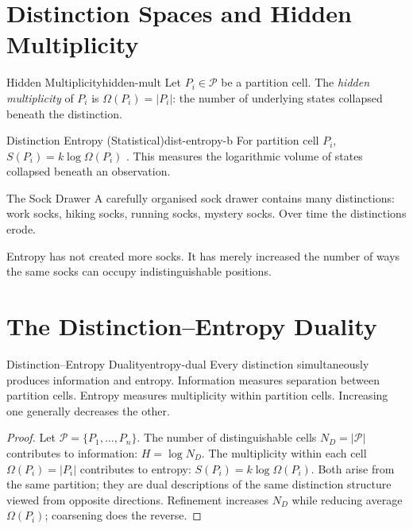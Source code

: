 \documentclass[12pt,twoside,openright]{book}
\newcommand{\partition}{\mathcal{P}}
\begin{document}
\section{Distinction Spaces and Hidden Multiplicity}
\label{sec:ch3-hidden}

\begin{definition}{Hidden Multiplicity}{hidden-mult}
  Let $P_i \in \partition$ be a partition cell.
  The \emph{hidden multiplicity} of $P_i$ is
  $\Omega(P_i) = |P_i|$: the number of underlying
  states collapsed beneath the distinction.
\end{definition}

\begin{definition}{Distinction Entropy (Statistical)}{dist-entropy-b}
  For partition cell $P_i$,
  $S(P_i) = k \log \Omega(P_i)$
  \parencite{boltzmann1877}.
  This measures the logarithmic volume of states
  collapsed beneath an observation.
\end{definition}

\begin{distinctionaside}{The Sock Drawer}
A carefully organised sock drawer contains many
distinctions: work socks, hiking socks, running socks,
mystery socks. Over time the distinctions erode.

Entropy has not created more socks. It has merely increased
the number of ways the same socks can occupy
indistinguishable positions.
\end{distinctionaside}

\section{The Distinction--Entropy Duality}
\label{sec:ch3-duality}

\begin{law}{Distinction--Entropy Duality}{entropy-dual}
  Every distinction simultaneously produces information
  and entropy. Information measures separation between
  partition cells. Entropy measures multiplicity within
  partition cells. Increasing one generally decreases the
  other. 
\end{law}

\begin{proof}
  Let $\partition = \{P_1,\ldots,P_n\}$. The number of
  distinguishable cells $N_D = |\partition|$ contributes
  to information: $H = \log N_D$. The multiplicity within
  each cell $\Omega(P_i) = |P_i|$ contributes to entropy:
  $S(P_i) = k\log\Omega(P_i)$. Both arise from the same
  partition; they are dual descriptions of the same
  distinction structure viewed from opposite directions.
  Refinement increases $N_D$ while reducing average
  $\Omega(P_i)$; coarsening does the reverse.
\end{proof}
\end{document}
